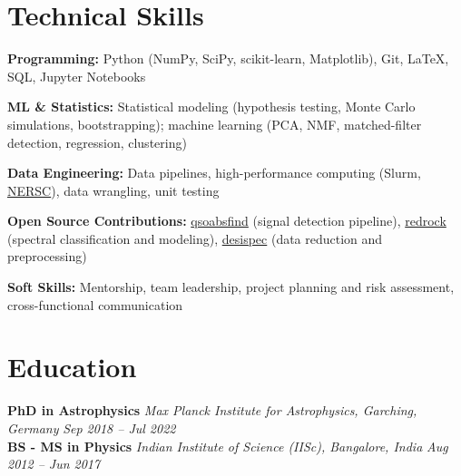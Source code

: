 \documentclass[a4paper,10pt]{article}
\begin{document}
\section*{Technical Skills}

\textcolor{sectionblue}{\textbf{Programming:}} 
Python (NumPy, SciPy, scikit-learn, Matplotlib), Git, LaTeX, SQL, Jupyter Notebooks

\textcolor{sectionblue}{\textbf{ML \& Statistics:}} 
Statistical modeling (hypothesis testing, Monte Carlo simulations, bootstrapping); 
machine learning (PCA, NMF, matched-filter detection, regression, clustering)

\textcolor{sectionblue}{\textbf{Data Engineering:}} 
Data pipelines, high-performance computing (Slurm, \href{https://www.nersc.gov}{NERSC}), data wrangling, unit testing

\textcolor{sectionblue}{\textbf{Open Source Contributions:}} 
\href{https://github.com/abhi0395/qsoabsfind}{qsoabsfind} (signal detection pipeline), 
\href{https://github.com/desihub/redrock}{redrock} (spectral classification and modeling), 
\href{https://github.com/desihub/desispec}{desispec} (data reduction and preprocessing)

\textcolor{sectionblue}{\textbf{Soft Skills:}} 
Mentorship, team leadership, project planning and risk assessment, cross-functional communication


\vspace*{-2mm}

\section*{Education}

\textcolor{sectionblue}{\textbf{PhD in Astrophysics}} \hfill \textit{Max Planck Institute for Astrophysics, Garching, Germany} \hfill \textit{Sep 2018 – Jul 2022}\\
\textcolor{sectionblue}{\textbf{BS - MS in Physics}} \hfill \textit{Indian Institute of Science (IISc), Bangalore, India} \hfill \textit{Aug 2012 – Jun 2017}
\vspace*{-2mm}
\end{document}
